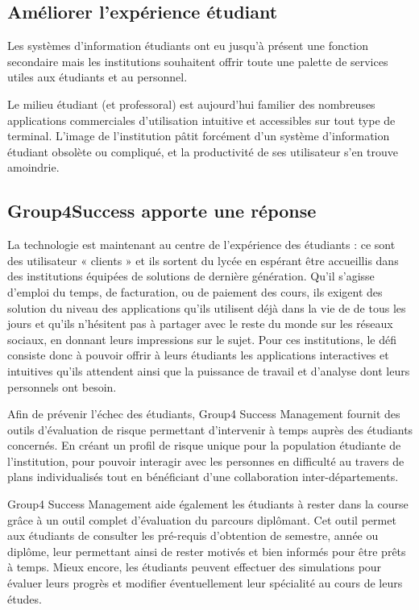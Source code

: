 \subsection{Améliorer l'expérience étudiant}
Les systèmes d'information étudiants ont eu jusqu'à présent une fonction secondaire mais les institutions souhaitent offrir toute une palette de services utiles aux étudiants et au personnel.
\medskip

Le milieu étudiant (et professoral) est aujourd'hui familier des nombreuses applications commerciales d'utilisation intuitive et accessibles sur tout type de terminal. L'image de l'institution pâtit forcément d'un système d'information étudiant obsolète ou compliqué, et la productivité de ses utilisateur s'en trouve amoindrie.

\subsection{Group4Success apporte une réponse}
La technologie est maintenant au centre de l'expérience des étudiants : ce sont des utilisateur « clients » et ils sortent du lycée en espérant être accueillis dans des institutions équipées de solutions de dernière génération. Qu'il s'agisse d'emploi du temps, de facturation, ou de paiement des cours, ils exigent des solution du niveau des applications qu'ils utilisent déjà dans la vie de de tous les jours et qu'ils n'hésitent pas à partager avec le reste du monde sur les réseaux sociaux, en donnant leurs impressions sur le sujet. Pour ces institutions, le défi consiste donc à pouvoir offrir à leurs étudiants les applications interactives et intuitives qu'ils attendent ainsi que la puissance de travail et d'analyse dont leurs personnels ont besoin.
\medskip

Afin de prévenir l'échec des étudiants, Group4 Success Management fournit des outils d'évaluation de risque permettant d'intervenir à temps auprès des étudiants concernés. En créant un profil de risque unique pour la population étudiante de l'institution, pour pouvoir interagir avec les personnes en difficulté au travers de plans individualisés tout en bénéficiant d'une collaboration inter-départements.
\medskip

Group4 Success Management aide également les étudiants à rester dans la course grâce à un outil complet d'évaluation du parcours diplômant. Cet outil permet aux étudiants de consulter les pré-requis d'obtention de semestre, année ou diplôme, leur permettant ainsi de rester motivés et bien informés pour être prêts à temps. Mieux encore, les étudiants peuvent effectuer des simulations pour évaluer leurs progrès et modifier éventuellement leur spécialité au cours de leurs études.
\medskip

